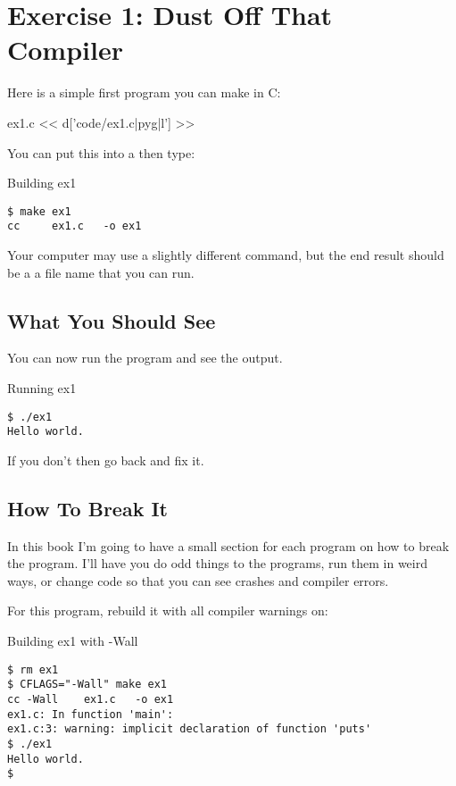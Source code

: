 \chapter{Exercise 1: Dust Off That Compiler}

Here is a simple first program you can make in C:

\begin{code}{ex1.c}
<< d['code/ex1.c|pyg|l'] >>
\end{code}

You can put this into a  then type:

\begin{Terminal}{Building ex1}
\begin{lstlisting}
$ make ex1
cc     ex1.c   -o ex1
\end{lstlisting}
\end{Terminal}

Your computer may use a slightly different command, but the end result should be a
a file name  that you can run.

\section{What You Should See}

You can now run the program and see the output.

\begin{Terminal}{Running ex1}
\begin{lstlisting}
$ ./ex1
Hello world.
\end{lstlisting}
\end{Terminal}

If you don't then go back and fix it.

\section{How To Break It}

In this book I'm going to have a small section for each program on how to
break the program.  I'll have you do odd things to the programs, run them
in weird ways, or change code so that you can see crashes and compiler errors.

For this program, rebuild it with all compiler warnings on:

\begin{Terminal}{Building ex1 with -Wall}
\begin{lstlisting}
$ rm ex1
$ CFLAGS="-Wall" make ex1
cc -Wall    ex1.c   -o ex1
ex1.c: In function 'main':
ex1.c:3: warning: implicit declaration of function 'puts'
$ ./ex1
Hello world.
$ 
\end{lstlisting}
\end{Terminal}

